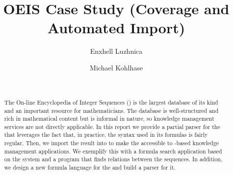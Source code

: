 \documentclass{deliverablereport}
\title{OEIS Case Study (Coverage and Automated Import)}
\author{Enxhell Luzhnica}
\author{Michael Kohlhase}
\begin{document}
\begin{abstract}\strut\\
  \begin{sffamily}\color{red}
  The On-line Encyclopedia of Integer Sequences (\oeis) is the largest database of its
  kind and an important resource for mathematicians. The database is well-structured and
  rich in mathematical content but is informal in nature, so knowledge management services
  are not directly applicable.  In this report we provide a partial parser for the \oeis
  that leverages the fact that, in practice, the syntax used in its formulas is fairly
  regular. Then, we import the result into \omdoc to make the \oeis accessible to
  \omdoc-based knowledge management applications. We exemplify this with a formula search
  application based on the \mws system and a program that finds relations between the
  \oeis sequences.  In addition, we design a new formula language for the \oeis and build
  a parser for it.
  \end{sffamily}
\end{abstract}
\maketitle

\newpage
\tableofcontents
\newpage









\newpage\printbibliography
\cleardoublepage


\nocite{IanKoh:mlkmim15}
\nocite{RabKoh:WSMSML13}
\nocite{Rabe:MAGMS13}
\nocite{oeis}
\nocite{DBLP:conf/lwa/LuzhnicaIK15}
\nocite{DBLP:conf/icms/LuzhnicaK16}
\end{document}
